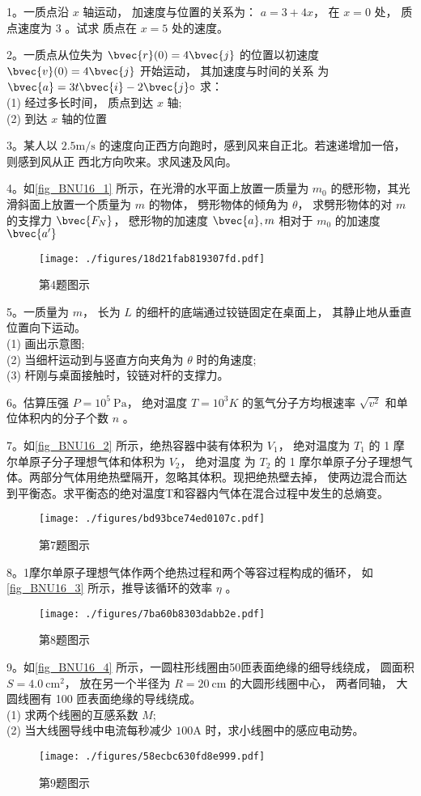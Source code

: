 
1。一质点沿 $x$ 轴运动， 加速度与位置的关系为： $a=3+4 x$， 在 $x=0$ 处， 质点速度为 3 。试求 质点在 $x=5$ 处的速度。

2。一质点从位失为 $\bvec{r}(0)=4 \bvec{j}$ 的位置以初速度 $\bvec{v}(0)=4 \bvec{j}$ 开始运动， 其加速度与时间的关系 为 $\bvec{a}=3 t \bvec{i}-2 \bvec{j} \circ$ 求：\\
(1) 经过多长时间， 质点到达 $x$ 轴;\\
(2) 到达 $x$ 轴的位置

3。某人以 $2.5 \mathrm{m / s}$ 的速度向正西方向跑时，感到风来自正北。若速递增加一倍， 则感到风从正 西北方向吹来。求风速及风向。

4。如\autoref{fig_BNU16_1} 所示，在光滑的水平面上放置一质量为 $m_{0}$ 的憵形物，其光滑斜面上放置一个质量为 $m$ 的物体， 劈形物体的倾角为 $\theta$， 求劈形物体的对 $m$ 的支撑力 $\bvec{F_{N}}$， 憵形物的加速度 $\bvec{a}, m$ 相对于 $m_{0}$ 的加速度 $\bvec{a^{\prime}}$
\begin{figure}[ht]
\centering
\texttt{[image: ./figures/18d21fab819307fd.pdf]}
\caption{第4题图示} \label{fig_BNU16_1}
\end{figure}
5。一质量为 $m$， 长为 $L$ 的细杆的底端通过铰链固定在桌面上， 其静止地从垂直位置向下运动。\\
(1) 画出示意图;\\
(2) 当细杆运动到与竖直方向夹角为 $\theta$ 时的角速度;\\
(3) 杆刚与桌面接触时，铰链对杆的支撑力。

6。估算压强 $P=10^{5} \mathrm{~Pa}$， 绝对温度 $T=10^{3} K$ 的氢气分子方均根速率 $\sqrt{v^{2}}$ 和单位体积内的分子个数 $n$ 。

7。如\autoref{fig_BNU16_2} 所示，绝热容器中装有体积为 $V_{1}$， 绝对温度为 $T_{1}$ 的 1 摩尔单原子分子理想气体和体积为 $V_{2}$， 绝对温度 为 $T_{2}$ 的 1 摩尔单原子分子理想气体。两部分气体用绝热壁隔开，忽略其体积。现把绝热壁去掉， 使两边混合而达到平衡态。求平衡态的绝对温度T和容器内气体在混合过程中发生的总熵变。
\begin{figure}[ht]
\centering
\texttt{[image: ./figures/bd93bce74ed0107c.pdf]}
\caption{第7题图示} \label{fig_BNU16_2}
\end{figure}
8。1摩尔单原子理想气体作两个绝热过程和两个等容过程构成的循环， 如\autoref{fig_BNU16_3} 所示，推导该循环的效率 $\eta$ 。
\begin{figure}[ht]
\centering
\texttt{[image: ./figures/7ba60b8303dabb2e.pdf]}
\caption{第8题图示} \label{fig_BNU16_3}
\end{figure}
9。如\autoref{fig_BNU16_4} 所示，一圆柱形线圈由50匝表面绝缘的细导线绕成， 圆面积 $S=4.0 \mathrm{~cm}^{2}$， 放在另一个半径为 $R=20 \mathrm{~cm}$ 的大圆形线圈中心， 两者同轴， 大圆线圈有 100 匝表面绝缘的导线绕成。\\
(1) 求两个线圈的互感系数 $M$;\\
(2) 当大线圈导线中电流每秒减少 $100\mathrm{A}$ 时，求小线圈中的感应电动势。
\begin{figure}[ht]
\centering
\texttt{[image: ./figures/58ecbc630fd8e999.pdf]}
\caption{第9题图示} \label{fig_BNU16_4}
\end{figure}

